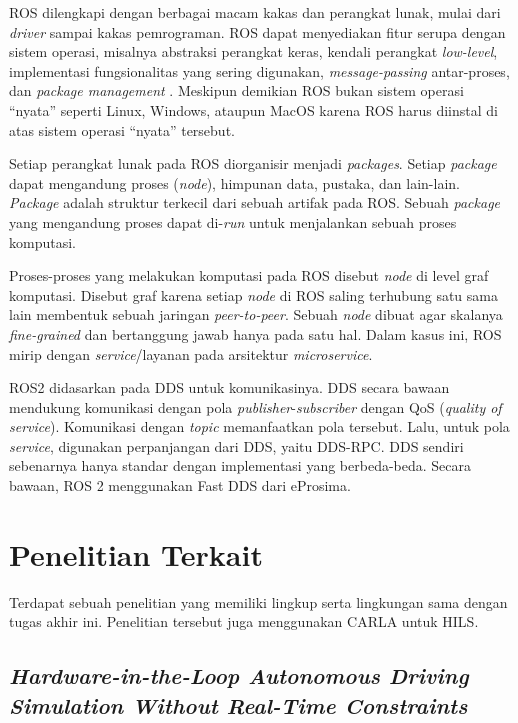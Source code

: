 ROS dilengkapi dengan berbagai macam kakas dan perangkat lunak, mulai dari
\textit{driver} sampai kakas pemrograman. ROS dapat menyediakan fitur serupa
dengan sistem operasi, misalnya abstraksi perangkat keras, kendali perangkat
\textit{low-level}, implementasi fungsionalitas yang sering digunakan,
\textit{message-passing} antar-proses, dan \textit{package management}
\parencite{x_rosIntro}.  Meskipun demikian ROS bukan sistem operasi ``nyata''
seperti Linux, Windows, ataupun MacOS karena ROS harus diinstal di atas sistem
operasi ``nyata'' tersebut.

Setiap perangkat lunak pada ROS diorganisir menjadi \textit{packages}. Setiap
\textit{package} dapat mengandung proses (\textit{node}), himpunan data,
pustaka, dan lain-lain. \textit{Package} adalah struktur terkecil dari sebuah
artifak pada ROS. Sebuah \textit{package} yang mengandung proses dapat
di-\textit{run} untuk menjalankan sebuah proses komputasi.

Proses-proses yang melakukan komputasi pada ROS disebut \textit{node} di level
graf komputasi. Disebut graf karena setiap \textit{node} di ROS saling terhubung
satu sama lain membentuk sebuah jaringan \textit{peer-to-peer}. Sebuah
\textit{node} dibuat agar skalanya \textit{fine-grained} dan bertanggung jawab
hanya pada satu hal. Dalam kasus ini, ROS mirip dengan \textit{service}/layanan
pada arsitektur \textit{microservice}.

ROS2 didasarkan pada DDS untuk komunikasinya. DDS secara bawaan mendukung
komunikasi dengan pola \textit{publisher}-\textit{subscriber} dengan QoS
(\textit{quality of service}). Komunikasi dengan \textit{topic} memanfaatkan
pola tersebut. Lalu, untuk pola \textit{service}, digunakan perpanjangan dari
DDS, yaitu DDS-RPC. DDS sendiri sebenarnya hanya standar dengan implementasi
yang berbeda-beda. Secara bawaan, ROS 2 menggunakan Fast DDS dari eProsima.

\section{Penelitian Terkait}

Terdapat sebuah penelitian yang memiliki lingkup serta lingkungan sama dengan
tugas akhir ini. Penelitian tersebut juga menggunakan CARLA untuk HILS.

\subsection{\textit{Hardware-in-the-Loop Autonomous Driving Simulation Without
        Real-Time Constraints}}

